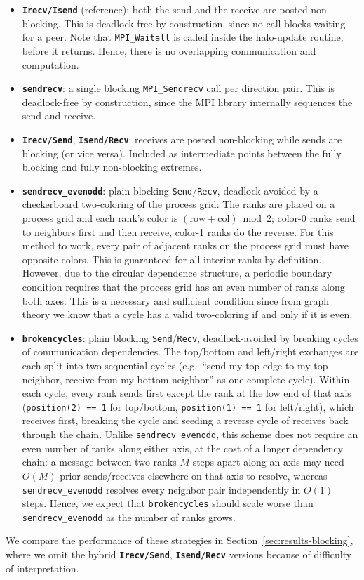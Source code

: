 \documentclass{article}
\begin{document}
\begin{itemize}
    \item \textbf{\texttt{Irecv/Isend}} (reference): both the send and
    the receive are posted non-blocking. This is deadlock-free by construction, since no call blocks waiting for a peer. Note that \texttt{MPI\_Waitall} is called inside the halo-update routine, before it returns. Hence, there is no overlapping communication and computation.
    \item \textbf{\texttt{sendrecv}}: a single blocking
    \texttt{MPI\_Sendrecv} call per direction pair. This is deadlock-free by construction, since the MPI library internally sequences the send
    and receive.
    \item \textbf{\texttt{Irecv/Send}}, \textbf{\texttt{Isend/Recv}}:
    receives are posted non-blocking while sends are blocking (or vice
    versa). Included as intermediate points between the fully blocking
    and fully non-blocking extremes.
    \item \textbf{\texttt{sendrecv\_evenodd}}: plain blocking
    \texttt{Send}/\texttt{Recv}, deadlock-avoided by a checkerboard two-coloring of the process grid: The ranks are placed on a process grid and each rank's color is $(\text{row} + \text{col}) \bmod 2$; color-0 ranks send to neighbors first and then receive, color-1 ranks do the reverse. For this method to work, every pair of adjacent ranks on the process grid must have opposite colors. This is guaranteed for all interior ranks by definition. However, due to the circular dependence structure, a periodic boundary condition requires that the process grid has an even number of ranks along both axes. This is a necessary and sufficient condition since from graph theory we know that a cycle has a valid two-coloring if and only if it is even.
    \item \textbf{\texttt{brokencycles}}: plain blocking
    \texttt{Send}/\texttt{Recv}, deadlock-avoided by breaking cycles of communication dependencies. The top/bottom and left/right exchanges are each split into two sequential cycles (e.g.\ ``send my top edge to my top neighbor, receive from my bottom neighbor'' as one complete cycle). Within each cycle, every rank sends first except the rank at the low end of that axis (\texttt{position(2) == 1} for top/bottom,
    \texttt{position(1) == 1} for left/right), which receives first,
    breaking the cycle and seeding a reverse cycle of receives back through the chain. Unlike \texttt{sendrecv\_evenodd}, this scheme does not require an even number of ranks along either axis, at the cost of a longer dependency chain: a message between two ranks $M$ steps apart along an axis may need $O(M)$ prior sends/receives elsewhere on that axis to resolve, whereas \texttt{sendrecv\_evenodd} resolves every neighbor pair independently in $O(1)$ steps. Hence, we expect that \texttt{brokencycles} should scale worse than \texttt{sendrecv\_evenodd} as the number of ranks grows.
\end{itemize}
We compare the performance of these strategies in Section~\ref{sec:results-blocking}, where we omit the hybrid \textbf{\texttt{Irecv/Send}}, \textbf{\texttt{Isend/Recv}} versions because of difficulty of interpretation.
\end{document}
